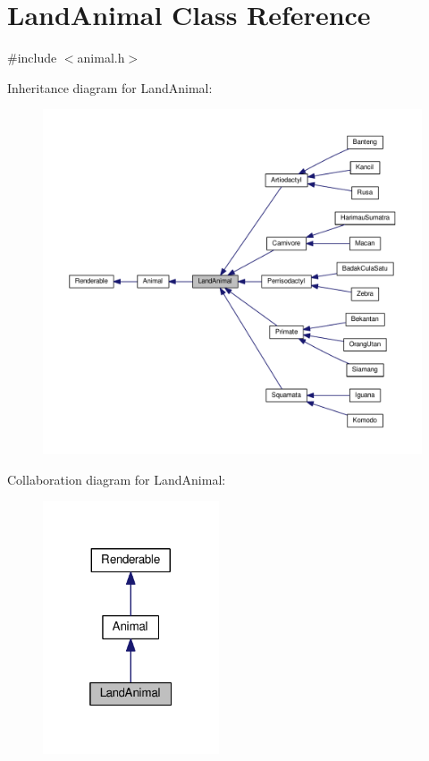 \hypertarget{classLandAnimal}{}\section{Land\+Animal Class Reference}
\label{classLandAnimal}


{\ttfamily \#include $<$animal.\+h$>$}



Inheritance diagram for Land\+Animal\+:
\nopagebreak
\begin{figure}[H]
\begin{center}
\leavevmode
\includegraphics[width=350pt]{classLandAnimal__inherit__graph}
\end{center}
\end{figure}


Collaboration diagram for Land\+Animal\+:
\nopagebreak
\begin{figure}[H]
\begin{center}
\leavevmode
\includegraphics[width=148pt]{classLandAnimal__coll__graph}
\end{center}
\end{figure}
